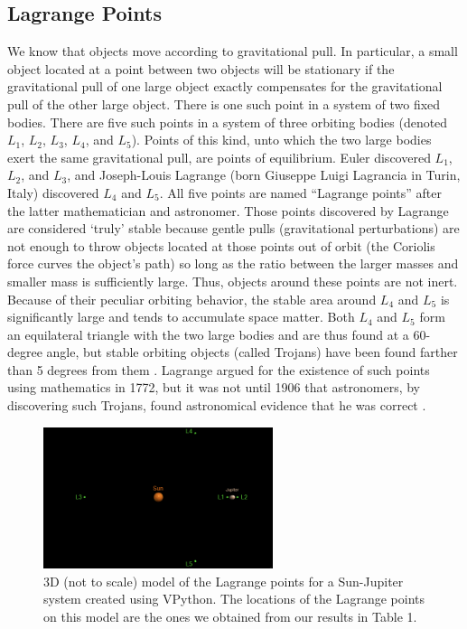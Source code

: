 \documentclass[linenumbers,RNAAS,trackchanges]{aastex631}
\begin{document}
\subsection{\textbf{Lagrange Points}} 
We know that objects move according to gravitational pull. In particular, a small object located at a point between two objects will be stationary if the gravitational pull of one large object exactly compensates for the gravitational pull of the other large object. There is one such point in a system of two fixed bodies. There are five such points in a system of three orbiting bodies (denoted $L_1$, $L_2$, $L_3$, $L_4$, and $L_5$). Points of this kind, unto which the two large bodies exert the same gravitational pull, are points of equilibrium. Euler discovered $L_1$, $L_2$, and $L_3$, and Joseph-Louis Lagrange (born Giuseppe Luigi Lagrancia in Turin, Italy) discovered $L_4$ and $L_5$. All five points are named “Lagrange points” after the latter mathematician and astronomer.  Those points discovered by Lagrange are considered ‘truly’ stable because gentle pulls (gravitational perturbations) are not enough to throw objects located at those points out of orbit (the Coriolis force curves the object’s path) so long as the ratio between the larger masses and smaller mass is sufficiently large. Thus, objects around these points are not inert. Because of their peculiar orbiting behavior, the stable area around $L_4$ and $L_5$ is significantly large and tends to accumulate space matter. Both $L_4$ and $L_5$ form an equilateral triangle with the two large bodies and are thus found at a 60-degree angle, but stable orbiting objects (called Trojans) have been found farther than 5 degrees from them  \cite[9]{Greenspan_2014}. Lagrange argued for the existence of such points using mathematics in 1772, but it was not until 1906 that astronomers, by discovering such Trojans, found astronomical evidence that he was correct \cite{Garner_2021}\cite[3]{Musielak_Quarles_2015}.

    \begin{figure}[H]
         \centering
         \includegraphics[width=0.6\textwidth]{Lagrange points model PS.png}
         \caption{3D (not to scale) model of the Lagrange points for a Sun-Jupiter system created using VPython. The locations of the Lagrange points on this model are the ones we obtained from our results in Table 1.}
    \end{figure}
\end{document}
